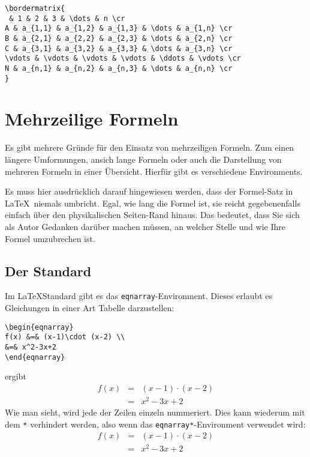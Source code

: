 \begin{verbatim}
\bordermatrix{
 & 1 & 2 & 3 & \dots & n \cr
A & a_{1,1} & a_{1,2} & a_{1,3} & \dots & a_{1,n} \cr
B & a_{2,1} & a_{2,2} & a_{2,3} & \dots & a_{2,n} \cr
C & a_{3,1} & a_{3,2} & a_{3,3} & \dots & a_{3,n} \cr
\vdots & \vdots & \vdots & \vdots & \ddots & \vdots \cr
N & a_{n,1} & a_{n,2} & a_{n,3} & \dots & a_{n,n} \cr
}
\end{verbatim}



\section{Mehrzeilige Formeln}

Es gibt mehrere Gründe für den Einsatz von mehrzeiligen Formeln. Zum einen längere Umformungen, ansich lange Formeln oder auch die Darstellung von mehreren Formeln in einer Übersicht. Hierfür gibt es verschiedene Environments.

Es muss hier ausdrücklich darauf hingewiesen werden, dass der Formel-Satz in \LaTeX\ niemals umbricht. Egal, wie lang die Formel ist, sie reicht gegebenenfalls einfach über den physikalischen Seiten-Rand hinaus. Das bedeutet, dass Sie sich als Autor Gedanken darüber machen müssen, an welcher Stelle und wie Ihre Formel umzubrechen ist. 

\subsection{Der Standard}

Im \LaTeX\-Standard gibt es das \texttt{eqnarray}-Environment. Dieses erlaubt es Gleichungen in einer Art Tabelle darzustellen:

\begin{verbatim}
\begin{eqnarray}
f(x) &=& (x-1)\cdot (x-2) \\
&=& x^2-3x+2
\end{eqnarray}
\end{verbatim}
ergibt
\begin{eqnarray}
f(x) &=& (x-1)\cdot (x-2) \\
&=& x^2-3x+2
\end{eqnarray}
Wie man sieht, wird jede der Zeilen einzeln nummeriert. Dies kann wiederum mit dem \texttt{*} verhindert werden, also wenn das \texttt{eqnarray*}-Environment verwendet wird:
\begin{eqnarray*}
f(x) &=& (x-1)\cdot (x-2) \\
&=& x^2-3x+2
\end{eqnarray*}

